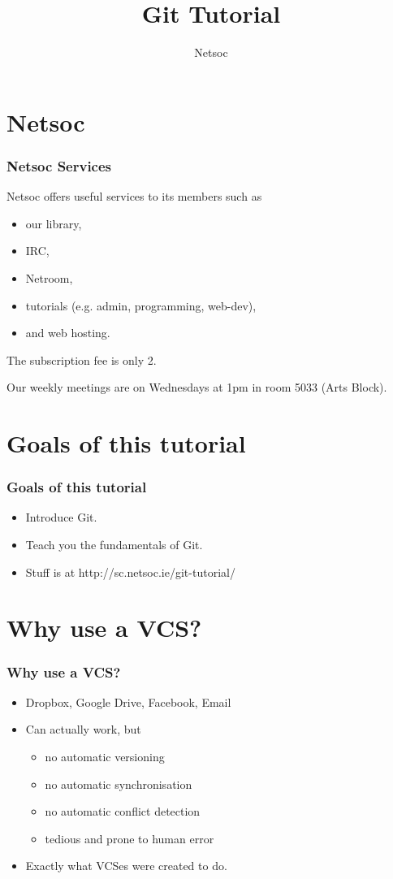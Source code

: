 \documentclass{beamer}
\title{Git Tutorial}
\author{Netsoc}
\date{}
\begin{document}
\frame{\titlepage}


\section{Netsoc}
\begin{frame}
\frametitle{Netsoc Services}
Netsoc offers useful services to its members such as
\begin{itemize}
	\pause
	\item our library,
	\pause
	\item IRC,
	\pause
	\item Netroom,
	\pause
	\item tutorials (e.g. admin, programming, web-dev),
	\pause
	\item and web hosting.
\end{itemize}
\pause

The subscription fee is only \EUR{}2.

\pause

Our weekly meetings are on Wednesdays at 1pm in room 5033 (Arts Block).
\end{frame}


\section{Goals of this tutorial}
\begin{frame}
\frametitle{Goals of this tutorial}
\begin{itemize}
\pause
\item Introduce Git.
\pause
\item Teach you the fundamentals of Git.
\pause
\item Stuff is at http://sc.netsoc.ie/git-tutorial/
\end{itemize}
\end{frame}


\section{Why use a VCS?}
\begin{frame}
\frametitle{Why use a VCS?}
\begin{itemize}
\pause
\item Dropbox, Google Drive, Facebook, Email
\pause
\item Can actually work, but
	\begin{itemize}
	\pause
	\item no automatic versioning
	\pause
	\item no automatic synchronisation
	\pause
	\item no automatic conflict detection
	\pause
	\item tedious and prone to human error
	\end{itemize}
\pause
\item Exactly what VCSes were created to do.
\end{itemize}
\end{frame}
\end{document}
